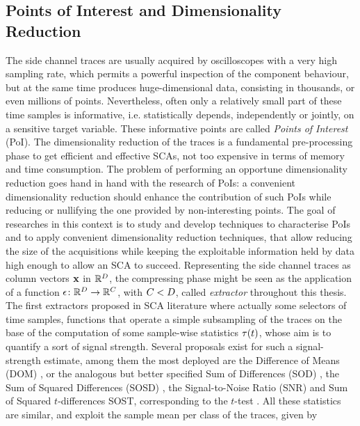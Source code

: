 \subsection{Points of Interest and Dimensionality Reduction}\label{sec:extractors}
The side channel traces are usually acquired by oscilloscopes with a very high sampling rate, which permits a powerful inspection of the component behaviour, but at the same time produces huge-dimensional data, consisting in thousands, or even millions of points. Nevertheless, often only a relatively small part of these time samples is informative, i.e. statistically depends, independently or jointly, on a sensitive target variable. These informative points are called \emph{Points of Interest} (PoI). The dimensionality reduction of the traces is a fundamental pre-processing phase to get efficient and effective SCAs, not too expensive in terms of memory and time consumption. The problem of performing an opportune dimensionality reduction goes hand in hand with the research of PoIs: a convenient dimensionality reduction should enhance the contribution of such PoIs while reducing or nullifying the one provided by non-interesting points. 
The goal of researches in this context is to study and develop techniques to characterise PoIs and to apply convenient dimensionality reduction techniques, that allow reducing the size of the acquisitions while keeping the exploitable information held by data high enough to allow an SCA to succeed.
Representing the side channel traces as column vectors ${\bf x}$ in $\mathbb{R}^D$, the compressing phase might be seen as the application of a function $\epsilon\colon \mathbb{R}^D\rightarrow \mathbb{R}^C$, with $C<D$, called {\em extractor} throughout this thesis. The first extractors proposed in SCA literature where actually some selectors of time samples, \ie functions that operate a simple subsampling of the traces on the base of the computation of some sample-wise statistics $\tau(t)$, whose aim is to quantify a sort of  signal strength. Several proposals exist for such a signal-strength estimate, among them the most deployed are the Difference of Means (DOM) \cite{Chari2003}, or the analogous but better specified Sum of Differences (SOD) \cite{Rechberger2005}, the Sum of Squared Differences (SOSD) \cite{gierlichs2006templates}, the Signal-to-Noise Ratio (SNR) \cite{mangard2008power,lomne2013behind} and  Sum of Squared $t$-differences SOST, corresponding to the $t$-test \cite{gierlichs2006templates}. All these statistics are similar, and exploit the sample mean per class of the traces, given by
